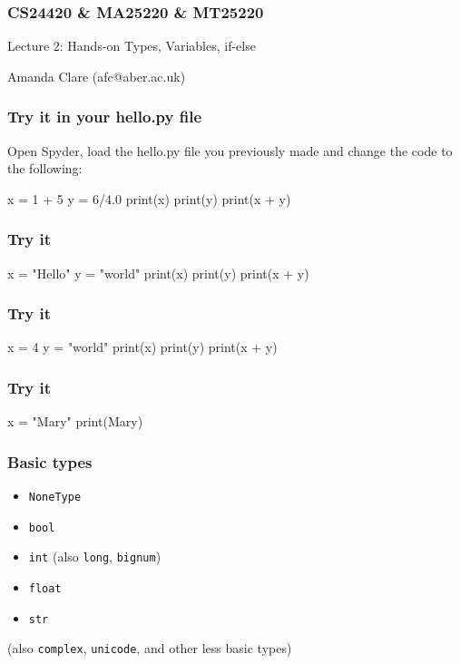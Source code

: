 \documentclass{beamer}
\begin{document}

\begin{frame}
\frametitle{CS24420 \& MA25220 \& MT25220}

\begin{center}
\begin{huge}
Lecture 2: Hands-on Types, Variables, if-else
\end{huge}
\bigskip

Amanda Clare (afc@aber.ac.uk)

\end{center}
\end{frame}


\begin{frame}[fragile]
\frametitle{Try it in your hello.py file}
Open Spyder, load the hello.py file you previously made and change the
code to the following:
\begin{code}
x = 1 + 5
y = 6/4.0
print(x)
print(y)
print(x + y)
\end{code}
\end{frame}

\begin{frame}[fragile]
\frametitle{Try it}
\begin{code}
x = "Hello"
y = "world"
print(x)
print(y)
print(x + y)
\end{code}
\end{frame}


\begin{frame}[fragile]
\frametitle{Try it}
\begin{code}
x = 4
y = "world"
print(x)
print(y)
print(x + y)
\end{code}
\end{frame}

\begin{frame}[fragile]
\frametitle{Try it}
\begin{code}
x = "Mary"
print(Mary)
\end{code}
\end{frame}



\begin{frame}
\frametitle{Basic types}
\begin{itemize}
\item {\tt NoneType}
\item {\tt bool}
\item {\tt int} (also {\tt long}, {\tt bignum})
\item {\tt float}
\item {\tt str} 
\end{itemize}
(also {\tt complex}, {\tt unicode}, and other less basic types)
\end{frame}
\end{document}
